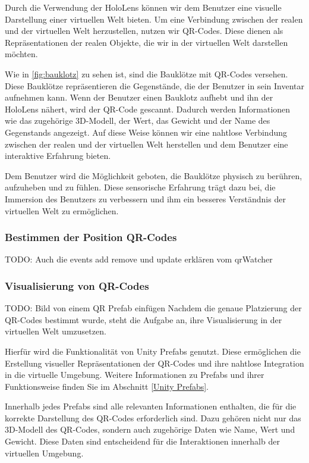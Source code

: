Durch die Verwendung der HoloLens können wir dem Benutzer eine visuelle Darstellung einer virtuellen Welt bieten. Um eine
Verbindung zwischen der realen und der virtuellen Welt herzustellen, nutzen wir QR-Codes.  Diese dienen als Repräsentationen
der realen Objekte, die wir in der virtuellen Welt darstellen möchten.

Wie in \ref{fig:bauklotz} zu sehen ist, sind die Bauklötze mit QR-Codes versehen. Diese Bauklötze repräsentieren die Gegenstände,
die der Benutzer in sein Inventar aufnehmen kann. Wenn der Benutzer einen Bauklotz aufhebt und ihn der HoloLens nähert, wird
der QR-Code gescannt. Dadurch werden Informationen wie das zugehörige 3D-Modell, der Wert, das Gewicht und der Name des
Gegenstands angezeigt. Auf diese Weise können wir eine nahtlose Verbindung zwischen der realen und der virtuellen Welt
herstellen und dem Benutzer eine interaktive Erfahrung bieten.

Dem Benutzer wird die Möglichkeit geboten, die Bauklötze physisch zu berühren, aufzuheben und zu fühlen. Diese sensorische
Erfahrung trägt dazu bei, die Immersion des Benutzers zu verbessern und ihm ein besseres Verständnis der virtuellen Welt
zu ermöglichen.

\subsubsection{Bestimmen der Position QR-Codes}
TODO: Auch die events add remove und update erklären vom qrWatcher

\subsubsection{Visualisierung von QR-Codes}
TODO: Bild von einem QR Prefab einfügen
Nachdem die genaue Platzierung der QR-Codes bestimmt wurde, steht die Aufgabe an, ihre Visualisierung in der virtuellen Welt umzusetzen.

Hierfür wird die Funktionalität von Unity Prefabs genutzt. Diese ermöglichen die Erstellung visueller Repräsentationen
der QR-Codes und ihre nahtlose Integration in die virtuelle Umgebung. Weitere Informationen zu Prefabs und ihrer Funktionsweise
finden Sie im Abschnitt \ref{Unity Prefabs}.

Innerhalb jedes Prefabs sind alle relevanten Informationen enthalten, die für die korrekte Darstellung des QR-Codes
erforderlich sind. Dazu gehören nicht nur das 3D-Modell des QR-Codes, sondern auch zugehörige Daten wie Name, Wert und
Gewicht. Diese Daten sind entscheidend für die Interaktionen innerhalb der virtuellen Umgebung.

